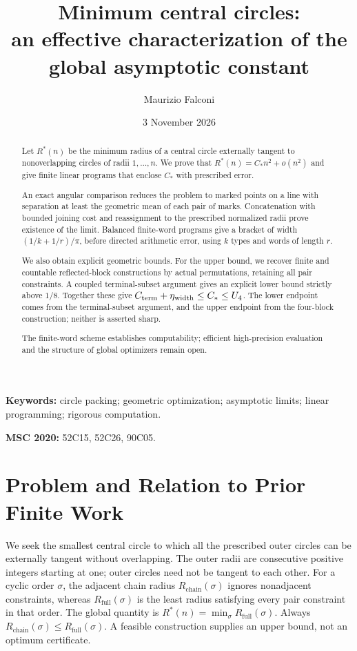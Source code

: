 \documentclass[11pt,letterpaper]{article}
\title{Minimum central circles:\\an effective characterization of the global asymptotic constant}
\author{Maurizio Falconi}
\date{3 November 2026}
\theoremstyle{definition}\newtheorem{definition}[theorem]{Definition}
\theoremstyle{remark}\newtheorem{remark}[theorem]{Remark}
\newcommand{\Rstar}{R^\ast}
\newcommand{\ch}{R_{\mathrm{chain}}}
\newcommand{\full}{R_{\mathrm{full}}}
\newcommand{\CC}{C_\ast}
\begin{document}
\maketitle
\linenumbers
\begin{abstract}
Let $\Rstar(n)$ be the minimum radius of a central circle externally tangent
to nonoverlapping circles of radii $1,\ldots,n$. We prove that
$\Rstar(n)=\CC n^2+o(n^2)$ and give finite linear programs that enclose
$\CC$ with prescribed error.

An exact angular comparison reduces the problem
to marked points on a line with separation at least the geometric mean of
each pair of marks. Concatenation with bounded joining cost and reassignment
to the prescribed normalized radii prove existence of the limit. Balanced finite-word
programs give a bracket of width $(1/k+1/r)/\pi$, before directed arithmetic
error, using $k$ types and words of length $r$.

We also obtain explicit geometric bounds. For the upper bound, we recover
finite and countable reflected-block constructions by actual permutations,
retaining all pair constraints. A coupled terminal-subset argument gives
an explicit lower bound strictly above $1/8$. Together these give
$C_{\rm term}+\eta_{\rm width}\le\CC\le U_4$.
The lower endpoint comes from the terminal-subset argument, and the upper
endpoint from the four-block construction; neither is asserted sharp.

The finite-word scheme establishes computability; efficient high-precision
evaluation and the structure of global optimizers remain open.
\end{abstract}
\noindent\textbf{Keywords:} circle packing; geometric optimization; asymptotic
limits; linear programming; rigorous computation.
\par\noindent\textbf{MSC 2020:} 52C15, 52C26, 90C05.


\section{Problem and Relation to Prior Finite Work}

We seek the smallest central circle to which all the prescribed outer
circles can be externally tangent without overlapping. The outer radii
are consecutive positive integers starting at one; outer circles need not
be tangent to each other. For a cyclic order $\sigma$, the adjacent
chain radius $\ch(\sigma)$ ignores nonadjacent constraints, whereas
$\full(\sigma)$ is the least radius satisfying every pair constraint in
that order. The global quantity is $\Rstar(n)=\min_\sigma\full(\sigma)$.
Always $\ch(\sigma)\le\full(\sigma)$. A feasible construction supplies
an upper bound, not an optimum certificate.
\end{document}
